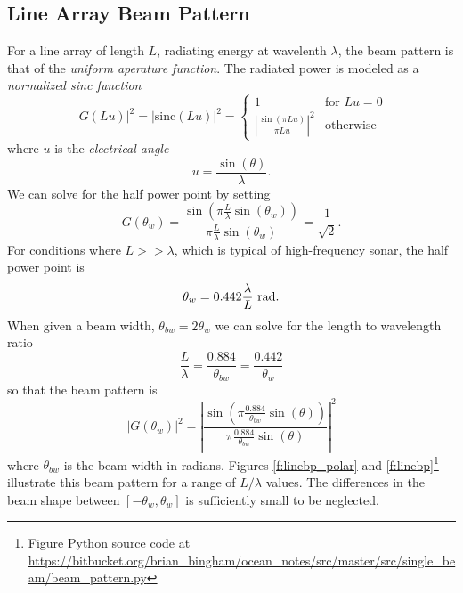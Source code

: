 \documentclass[11pt]{article}
\begin{document}
\subsection{Line Array Beam Pattern}
For a line array of length $L$, radiating energy at wavelenth $\lambda$, the beam pattern is that of the \emph{uniform aperature function}.  The radiated power is modeled as a \emph{normalized sinc function}
\[
\left| G(L u) \right|^2 =  \left|\mathrm{sinc}(L u)\right|^2 = 
\begin{cases}
  1 & \text{for} \, \,  Lu = 0 \\
 \left| \frac{\sin(\pi L u)}{\pi L u} \right|^2  & \text{otherwise}
  \end{cases}
\]
where $u$ is the \emph{electrical angle}
\[
u = \frac{\sin(\theta)}{\lambda}.
\]
We can solve for the half power point by setting
\[
G(\theta_w) = \frac{\sin(\pi \frac{L}{\lambda} \sin(\theta_w))}{\pi \frac{L}{\lambda} \sin(\theta_w)} = \frac{1}{\sqrt{2}}.
\]
For conditions where $L >> \lambda$, which is typical of high-frequency sonar, the half power point is
\[
\theta_{w} = 0.442 \frac{\lambda}{L} \,\, \unit[]{rad}.
\]
When given a beam width, $\theta_{bw} = 2 \theta_w$ we can solve for the length to wavelength ratio
\[
\frac{L}{\lambda} = \frac{0.884}{\theta_{bw}} = \frac{0.442}{\theta_w}
\]
so that the beam pattern is
\[
\left| G(\theta_w) \right|^2 = \left| \frac{\sin(\pi \frac{0.884}{\theta_{bw}} \sin(\theta))}{\pi \frac{0.884}{\theta_{bw}} \sin(\theta)} \right|^2
\]
where $\theta_{bw}$ is the beam width in radians.  Figures \ref{f:linebp_polar} and \ref{f:linebp}\footnote{Figure Python source code at \url{https://bitbucket.org/brian_bingham/ocean_notes/src/master/src/single_beam/beam_pattern.py}} illustrate this beam pattern for a range of $L/\lambda$ values.  The differences in the beam shape between $[-\theta_w,\theta_w]$ is sufficiently small to be neglected.
\end{document}
